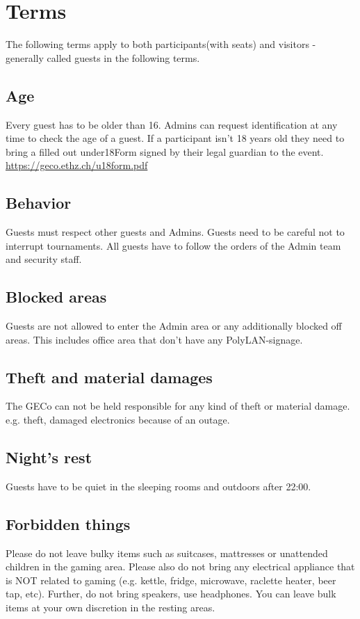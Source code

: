 \documentclass{article}
\begin{document}
\section{Terms}
The following terms apply to both participants(with seats) and visitors - generally called guests in the following terms.

\subsection{Age}
Every guest has to be older than 16. Admins can request identification at any time to check the age of a guest.
If a participant isn't 18 years old they need to bring a filled out under18Form signed by their legal guardian to the event. \url{https://geco.ethz.ch/u18form.pdf}

\subsection{Behavior}
Guests must respect other guests and Admins. Guests need to be careful not to interrupt tournaments. All guests have to follow the orders of the Admin team and security staff.

\subsection{Blocked areas}
Guests are not allowed to enter the Admin area or any additionally blocked off areas. This includes office area that don't have any PolyLAN-signage.

\subsection{Theft and material damages}
The GECo can not be held responsible for any kind of theft or material damage.\\ 
e.g. theft, damaged electronics because of an outage.

\subsection{Night's rest} 
Guests have to be quiet in the sleeping rooms and outdoors after 22:00.

\subsection{Forbidden things}
Please do not leave bulky items such as suitcases, mattresses or unattended children in the gaming area. Please also do not bring any electrical appliance that is NOT related to gaming (e.g. kettle, fridge, microwave, raclette heater, beer tap, etc). Further, do not bring speakers, use headphones.
You can leave bulk items at your own discretion in the resting areas.
\end{document}
